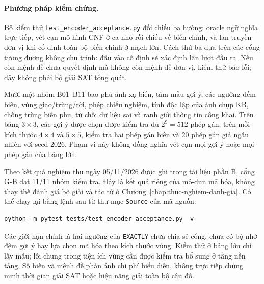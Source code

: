 \paragraph{Phương pháp kiểm chứng.}
Bộ kiểm thử \texttt{test\_encoder\_acceptance.py} đối chiếu ba hướng: oracle ngữ nghĩa trực tiếp, vét cạn mô hình CNF ở ca nhỏ rồi chiếu về biến chính, và lan truyền đơn vị khi cố định toàn bộ biến chính ở mạch lớn. Cách thứ ba dựa trên các cổng tương đương không chu trình: đầu vào cố định sẽ xác định lần lượt đầu ra. Nếu còn mệnh đề chưa quyết định mà không còn mệnh đề đơn vị, kiểm thử báo lỗi; đây không phải bộ giải SAT tổng quát.

Mười một nhóm B01--B11 bao phủ ánh xạ biến, tám mẫu gợi ý, các ngưỡng đếm biên, vùng giao/trùng/rời, phép chiếu nghiệm, tính độc lập của ảnh chụp KB, chống trùng biến phụ, từ chối dữ liệu sai và ranh giới thông tin công khai. Trên bảng $3\times3$, các gợi ý được chọn được kiểm tra đủ $2^9=512$ phép gán; trên mỗi kích thước $4\times4$ và $5\times5$, kiểm tra hai phép gán biên và 20 phép gán giả ngẫu nhiên với seed 2026. Phạm vi này không đồng nghĩa vét cạn mọi gợi ý hoặc mọi phép gán của bảng lớn.

Theo kết quả nghiệm thu ngày 05/11/2026 được ghi trong tài liệu phần B, cổng G-B đạt 11/11 nhóm kiểm tra. Đây là kết quả riêng của mô-đun mã hóa, không thay thế đánh giá bộ giải và tác tử ở Chương~\ref{chap:thuc-nghiem-danh-gia}. Có thể chạy lại bằng lệnh sau từ thư mục \texttt{Source} của mã nguồn:
\begin{verbatim}
python -m pytest tests/test_encoder_acceptance.py -v
\end{verbatim}

Các giới hạn chính là hai ngưỡng của \texttt{EXACTLY} chưa chia sẻ cổng, chưa có bộ nhớ đệm gợi ý hay lựa chọn mã hóa theo kích thước vùng. Kiểm thử ở bảng lớn chỉ lấy mẫu; lỗi chung trong tiện ích vùng cần được kiểm tra bổ sung ở tầng nền tảng. Số biến và mệnh đề phản ánh chi phí biểu diễn, không trực tiếp chứng minh thời gian giải SAT hoặc hiệu năng giải toàn bộ câu đố.
